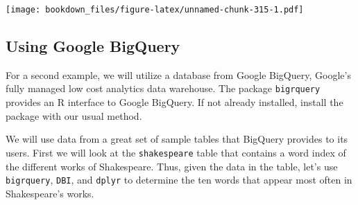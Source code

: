 \documentclass[]{krantz}
\makeatletter
\newenvironment{Shaded}{\begin{snugshade}}{\end{snugshade}}
\newcommand{\KeywordTok}[1]{\textcolor[rgb]{0.27,0.27,0.27}{\textbf{#1}}}
\newcommand{\DataTypeTok}[1]{\textcolor[rgb]{0.27,0.27,0.27}{#1}}
\newcommand{\DecValTok}[1]{\textcolor[rgb]{0.06,0.06,0.06}{#1}}
\newcommand{\StringTok}[1]{\textcolor[rgb]{0.5,0.5,0.5}{#1}}
\newcommand{\OtherTok}[1]{\textcolor[rgb]{0.37,0.37,0.37}{#1}}
\newcommand{\OperatorTok}[1]{\textcolor[rgb]{0.43,0.43,0.43}{\textbf{#1}}}
\newcommand{\NormalTok}[1]{#1}
\newenvironment{kframe}{%
\medskip{}
\setlength{\fboxsep}{.8em}
 \def\at@end@of@kframe{}%
 \ifinner\ifhmode%
  \def\at@end@of@kframe{\end{minipage}}%
  \begin{minipage}{\columnwidth}%
 \fi\fi%
 \def\FrameCommand##1{\hskip\@totalleftmargin \hskip-\fboxsep
 \colorbox{shadecolor}{##1}\hskip-\fboxsep
     \hskip-\linewidth \hskip-\@totalleftmargin \hskip\columnwidth}%
 \MakeFramed {\advance\hsize-\width
   \@totalleftmargin\z@ \linewidth\hsize
   \@setminipage}}%
 {\par\unskip\endMakeFramed%
 \at@end@of@kframe}
\renewenvironment{Shaded}{\begin{kframe}}{\end{kframe}}
\makeatother
\begin{document}
\texttt{[image: bookdown\_files/figure-latex/unnamed-chunk-315-1.pdf]}

\subsection{Using Google BigQuery}\label{using-google-bigquery}

For a second example, we will utilize a database from Google BigQuery,
Google's fully managed low cost analytics data warehouse. The package
\texttt{bigrquery} provides an R interface to Google BigQuery. If not
already installed, install the package with our usual method.

We will use data from a great set of sample tables that BigQuery
provides to its users. First we will look at the \texttt{shakespeare}
table that contains a word index of the different works of Shakespeare.
Thus, given the data in the table, let's use \texttt{bigrquery},
\texttt{DBI}, and \texttt{dplyr} to determine the ten words that appear
most often in Shakespeare's works.

\begin{Shaded}
\end{Shaded}
\end{document}
